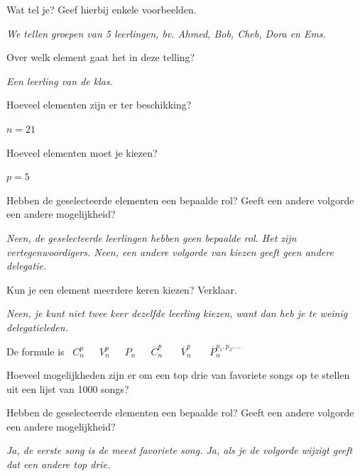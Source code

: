 \begin{werktekstoef}

\item {Wat tel je? Geef hierbij enkele voorbeelden.}

\emph{We tellen groepen van 5 leerlingen, bv. Ahmed, Bob, Cheb, Dora en Ems.}

\item{Over welk element gaat het in deze telling?}

\emph{Een leerling van de klas.}

\item{Hoeveel elementen zijn er ter beschikking?}

\emph{$n=21$}

\item{Hoeveel elementen moet je kiezen?}

\emph{$p=5$}

\item {Hebben de geselecteerde elementen een bepaalde rol? Geeft een andere volgorde een andere mogelijkheid?}

\emph{Neen, de geselecteerde leerlingen hebben geen bepaalde rol. Het zijn vertegenwoordigers. Neen, een andere volgorde van kiezen geeft geen andere delegatie.}

\item {Kun je een element meerdere keren kiezen? Verklaar.}

\emph{Neen, je kunt niet twee keer dezelfde leerling kiezen, want dan heb je te weinig delegatieleden.}

\end{werktekstoef}

De formule is \ $C_n^p$\ \ \ $V_n^p$\ \ \ $P_n$\ \ \ $\overline{C}_n^p$ \ \ \ $\overline{V}_n^p$ \ \ \ $\overline{P}_n^{p_1,p_2, \dots}$


Hoeveel mogelijkheden zijn er om een top drie van favoriete songs op te stellen uit een lijst van 1000 songs? 

\begin{werktekstoef}
\setcounter{enumi}{4}
\item{Hebben de geselecteerde elementen een bepaalde rol? Geeft een andere volgorde een andere mogelijkheid?}

\emph{Ja, de eerste song is de meest favoriete song. Ja, als je de volgorde wijzigt geeft dat een andere top drie.}
 \end{werktekstoef}
 

